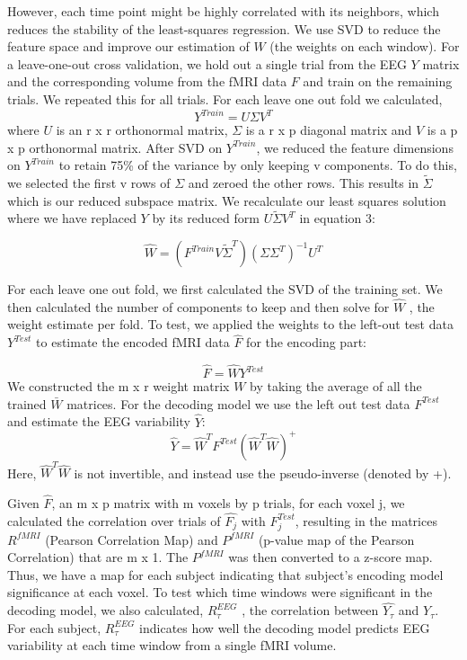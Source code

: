 However, each time point might be highly correlated with its neighbors, which reduces the stability of the least-squares regression. We use SVD to reduce the feature space and improve our estimation of $W$ (the weights on each window). For a leave-one-out cross validation, we hold out a single trial from the EEG $Y$ matrix and the corresponding volume from the fMRI data $F$ and train on the remaining trials. We repeated this for all trials. For each leave one out fold we calculated,
\begin{equation}
    Y^{Train}=U \Sigma V^{T}
\end{equation}					
where $U$ is an r x r orthonormal matrix, $\Sigma$ is a r x p diagonal matrix and $V$ is a p x p orthonormal matrix. After SVD on $Y^{Train}$, we reduced the feature dimensions on $Y^{Train}$  to retain 75\% of the variance by only keeping v components. To do this, we selected the first v rows of $\Sigma$ and zeroed the other rows. This results in $\tilde{\Sigma}$  which is our reduced subspace matrix. We recalculate our least squares solution where we have replaced $Y$ by its reduced form $U\tilde{\Sigma}V^{T}$ in equation 3:
 		
\begin{equation}
    \hat{W} = (F^{Train}V\tilde{\Sigma}^{T})(\Sigma\Sigma^{T})^{-1}U^{T}
\end{equation} 				
 			
For each leave one out fold, we first calculated the SVD of the training set. We then calculated the number of components to keep and then solve for $\hat{W}$ , the weight estimate per fold. To test, we applied the weights to the left-out test data $Y^{Test}$ to estimate the encoded fMRI data $\hat{F}$ for the encoding part:

\begin{equation}
    \hat{F}=\hat{W}Y^{Test}
\end{equation}
We constructed the m x r weight matrix $W$ by taking the average of all the trained $\bar{W}$ matrices. For the decoding model we use the left out test data $F^{Test}$ and estimate the EEG variability $\hat{Y}$:
 \begin{equation}
     \hat{Y} = \hat{W}^{T}F^{Test}(\hat{W}^{T}\hat{W})^{+}
 \end{equation}
 Here, $\hat{W}^{T}\hat{W}$ is not invertible, and instead use the pseudo-inverse (denoted by +).
 
Given  $\hat{F}$, an m x p matrix with m voxels by p trials, for each voxel j, we calculated the correlation over trials of $\hat{F_{j}}$ with $F^{Test}_{j}$, resulting in the matrices $R^{fMRI}$ (Pearson Correlation Map) and $P^{fMRI}$  (p-value map of the Pearson Correlation) that are m x 1. The $P^{fMRI}$ was then converted to a z-score map. Thus, we have a map for each subject indicating that subject’s encoding model significance at each voxel. To test which time windows were significant in the decoding model, we also calculated,  $R^{EEG}_{\tau}$ , the correlation between $\hat{Y_{\tau}}$ and $Y_{\tau}$. For each subject, $R^{EEG}_{\tau}$ indicates how well the decoding model predicts EEG variability at each time window from a single fMRI volume. 

